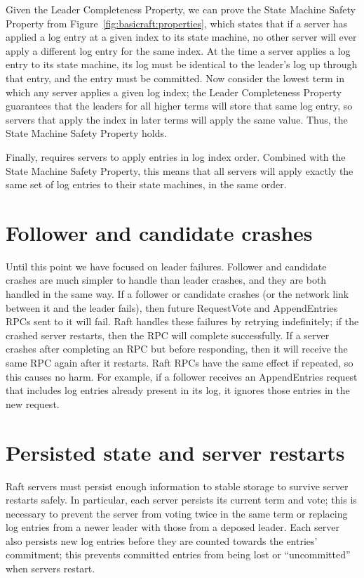 Given the Leader Completeness Property, we can prove the State Machine
Safety Property from Figure~\ref{fig:basicraft:properties}, which states that
if a server has applied a log entry at a given index to its state
machine, no other server will ever apply a different log entry for the
same index.
At the time a server applies a log entry to its state machine, its log
must be identical to the leader's log up through that entry, and the
entry must be committed. Now consider the lowest term
in which any server applies a given log index; the Leader Completeness Property
guarantees that the leaders for all higher terms will store that same log
entry, so servers that apply the index in later terms will apply the same
value. Thus, the State Machine Safety Property holds.

Finally, \name{} requires servers to apply entries in log index order.
Combined with the State Machine Safety Property, this means that all
servers will apply exactly the same set of log entries to their state
machines, in the same order.

\section{Follower and candidate crashes}
Until this point we have focused on leader failures.
Follower and candidate crashes are much simpler to handle than leader
crashes, and they are both handled in the same way.
If a follower or candidate crashes (or the network link between it and
the leader fails), then future RequestVote and AppendEntries
RPCs sent to it will fail. Raft handles these failures by
retrying indefinitely;
if the crashed server restarts, then the RPC will complete
successfully.
If a server crashes after
completing an RPC but before responding, then it will receive the same
RPC again after it restarts. Raft RPCs have the same effect if repeated,
so this causes no harm. For example, if a follower receives an
AppendEntries request that includes log entries already present in
its log, it ignores those entries in the new request.

\section{Persisted state and server restarts}

Raft servers must persist enough information to stable storage to
survive server restarts safely. In particular, each server persists its
current term and vote; this is necessary to prevent the server from
voting twice in the same term or replacing log entries from a newer
leader with those from a deposed leader. Each server also persists new
log entries before they are counted towards the entries' commitment;
this prevents committed entries from being lost or ``uncommitted'' when
servers restart.

